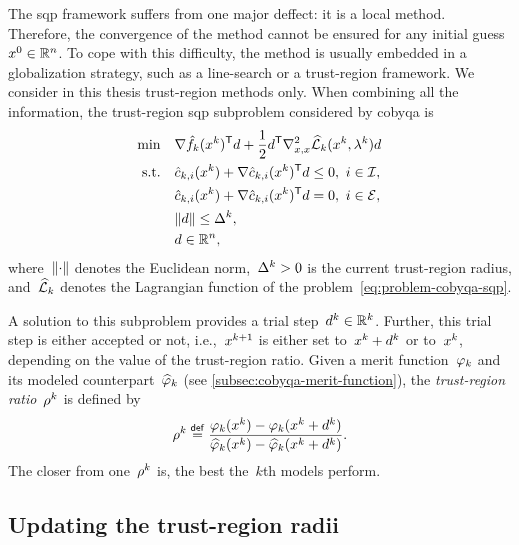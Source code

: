 The \gls{sqp} framework suffers from one major deffect: it is a local method.
Therefore, the convergence of the method cannot be ensured for any initial guess~$\iter[0] \in \R^n$.
To cope with this difficulty, the method is usually embedded in a globalization strategy, such as a line-search or a trust-region framework.
We consider in this thesis trust-region methods only.
When combining all the information, the trust-region \gls{sqp} subproblem considered by \gls{cobyqa} is
\begin{subequations}
    \begin{align}
        \min        & \quad \nabla \objm[k](\iter[k])^{\T} \step + \frac{1}{2} \step^{\T} \nabla_{x, x}^2 \lagm[k](\iter[k], \lambda^k) \step \label{derivative-free-trust-region-sqp-subproblem-obj}\\
        \text{s.t.} & \quad \conm[k]{i}(\iter[k]) + \nabla \conm[k]{i}(\iter[k])^{\T} \step \le 0, ~ i \in \iub,\\
                    & \quad \conm[k]{i}(\iter[k]) + \nabla \conm[k]{i}(\iter[k])^{\T} \step = 0, ~ i \in \ieq,\\
                    & \quad \norm{\step} \le \rad[k],\\
                    & \quad \step \in \R^n,
    \end{align}
\end{subequations}
where~$\lVert\cdot\rVert$ denotes the Euclidean norm,~$\rad[k] > 0$ is the current trust-region radius, and~$\lagm[k]$ denotes the Lagrangian function of the problem~\cref{eq:problem-cobyqa-sqp}.

A solution to this subproblem provides a trial step~$d^k \in \mathbb{R}^k$.
Further, this trial step is either accepted or not, i.e.,~$\iter[k + 1]$ is either set to~$\iter[k] + d^k$ or to~$\iter[k]$, depending on the value of the trust-region ratio.
Given a merit function~$\merit[k]$ and its modeled counterpart~$\meritm[k]$ (see \cref{subsec:cobyqa-merit-function}), the \emph{trust-region ratio}~$\ratio[k]$ is defined by
\begin{equation*}
    \ratio[k] \eqdef \frac{\merit[k](\iter[k]) - \merit[k](\iter[k] + d^k)}{\meritm[k](\iter[k]) - \meritm[k](\iter[k] + d^k)}.
\end{equation*}
The closer from one~$\ratio[k]$ is, the best the~$k$th models perform.

\subsection{Updating the trust-region radii}

